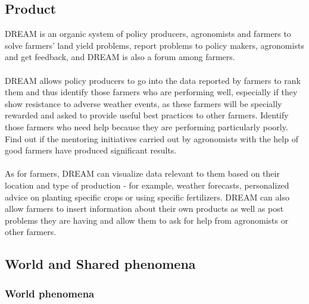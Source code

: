 \documentclass[../../main.tex]{subfiles}
\begin{document}
\subsection{Product}

DREAM is an organic system of policy producers, agronomists and farmers to solve farmers' land yield problems, report problems to policy makers, agronomists and get feedback, and DREAM is also a forum among farmers.\\ \\
DREAM allows policy producers to go into the data reported by farmers to rank them and thus identify those farmers who are performing well, especially if they show resistance to adverse weather events, as these farmers will be specially rewarded and asked to provide useful best practices to other farmers. Identify those farmers who need help because they are performing particularly poorly. Find out if the mentoring initiatives carried out by agronomists with the help of good farmers have produced significant results.\\ \\
As for farmers, DREAM can visualize data relevant to them based on their location and type of production - for example, weather forecasts, personalized advice on planting specific crops or using specific fertilizers. DREAM can also allow farmers to insert information about their own products as well as post problems they are having and allow them to ask for help from agronomists or other farmers.


\subsection{World and Shared phenomena}


\subsubsection{World phenomena}
\end{document}
